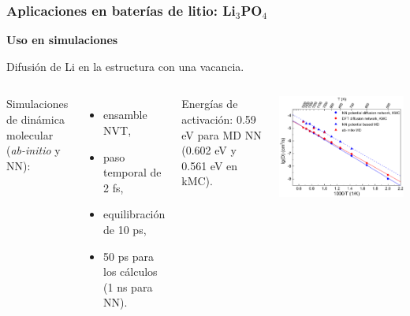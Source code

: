\documentclass[aspectratio=169]{beamer}
\let\oldtextbf\textbf
\renewcommand{\textbf}[1]{\textcolor{nordblue}{\oldtextbf{#1}}}
\begin{document}
    \begin{frame}
        \frametitle{Aplicaciones en baterías de litio: Li$_3$PO$_4$}
            
        \textbf{Uso en simulaciones}

        Difusión de Li en la estructura con una vacancia.
        
        \begin{columns}
            Simulaciones de dinámica molecular (\textit{ab-initio} y NN):
            \begin{itemize}
                \item ensamble NVT,
                \item paso temporal de 2 fs,
                \item equilibración de 10 ps,
                \item 50 ps para los cálculos (1 ns para NN).
            \end{itemize}

            Energías de activación: 0.59 eV para MD NN (0.602 eV y 0.561 eV en 
            kMC). 
            \begin{center}
                \includegraphics[width=\columnwidth]{Li3PO4-kMC-arrhenius.png}
            \end{center}
        \end{columns}

    \end{frame}
    
\end{document}
